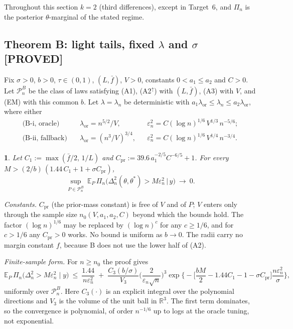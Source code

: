 \documentclass[11pt]{article}
\newcommand{\R}{\mathbb{R}}
\newcommand{\E}{\mathbb{E}}
\newcommand{\Pn}{\mathcal{P}_n}
\newcommand{\Post}{\Pi_n}
\newcommand{\stPROVED}{\textcolor{proved}{\textsf{\textbf{[PROVED]}}}}
\theoremstyle{plain}
\newcommand{\mythmname}{}
\newtheorem*{namedx}{\mythmname}
\newenvironment{named}[1]{\renewcommand{\mythmname}{#1}\begin{namedx}}{\end{namedx}}
\theoremstyle{definition}
\theoremstyle{remark}
\begin{document}
Throughout this section $k=2$ (third differences), except in Target~6, and $\Post$ is the posterior $\theta$-marginal of the stated regime.

\subsection{\texorpdfstring{Theorem B: light tails, fixed $\lambda$ and $\sigma$ \quad \stPROVED}{Theorem B: light tails, fixed lambda and sigma [PROVED]}}

Fix $\sigma>0$, $b>0$, $\tau\in(0,1)$, $(L,\bar f)$, $V>0$, constants $0<a_1\le a_2$ and $C>0$. Let $\Pn^{B}$ be the class of laws satisfying (A1), (A2$^{\uparrow}$) with $(L,\bar f)$, (A3) with $V$, and (EM) with this common $b$. Let $\lambda=\lambda_n$ be deterministic with $a_1\lambda_{\mathrm{or}}\le\lambda_n\le a_2\lambda_{\mathrm{or}}$, where either
\begin{align*}
\text{(B-i, oracle)}\quad &\lambda_{\mathrm{or}} = n^{5/2}/V, && \varepsilon_n^2 = C(\log n)^{1/6}\,V^{1/3}\,n^{-5/6};\\
\text{(B-ii, fallback)}\quad &\lambda_{\mathrm{or}} = (n^3/V)^{3/4}, && \varepsilon_n^2 = C(\log n)^{1/6}\,V^{1/4}\,n^{-3/4}.
\end{align*}

\begin{named}{Theorem B}
Let $C_1:=\max(\bar f/2,\,1/L)$ and $C_{\mathrm{pr}} := 39.6\,a_1^{-2/5}C^{-6/5}+1$. For every $M > (2/b)\,(1.44\,C_1 + 1 + \sigma C_{\mathrm{pr}})$,
\[
\sup_{P\in\Pn^{B}}\ \E_P\,\Post\big(\Delta_n^2(\theta,\theta^*) > M\varepsilon_n^2 \,\big|\, y\big)\ \longrightarrow\ 0 .
\]
\end{named}

\noindent\textit{Constants.} $C_{\mathrm{pr}}$ (the prior-mass constant) is free of $V$ and of $P$; $V$ enters only through the sample size $n_0(V,a_1,a_2,C)$ beyond which the bounds hold. The factor $(\log n)^{1/6}$ may be replaced by $(\log n)^c$ for any $c\ge1/6$, and for $c>1/6$ any $C_{\mathrm{pr}}>0$ works. No bound is uniform as $b\to0$. The radii carry no margin constant $f$, because B does not use the lower half of (A2).

\noindent\textit{Finite-sample form.} For $n\ge n_0$ the proof gives
\[
\E_P\,\Post\big(\Delta_n^2>M\varepsilon_n^2\mid y\big)\ \le\ \frac{1.44}{n\varepsilon_n^2}\;+\;\frac{C_3(b/\sigma)}{V_3}\Big(\frac{2}{\varepsilon_n\sqrt n}\Big)^{3}\exp\Big\{-\Big[\frac{bM}{2}-1.44C_1-1-\sigma C_{\mathrm{pr}}\Big]\frac{n\varepsilon_n^2}{\sigma}\Big\},
\]
uniformly over $\Pn^B$. Here $C_3(\cdot)$ is an explicit integral over the polynomial directions and $V_3$ is the volume of the unit ball in $\R^3$. The first term dominates, so the convergence is polynomial, of order $n^{-1/6}$ up to logs at the oracle tuning, not exponential.
\end{document}
